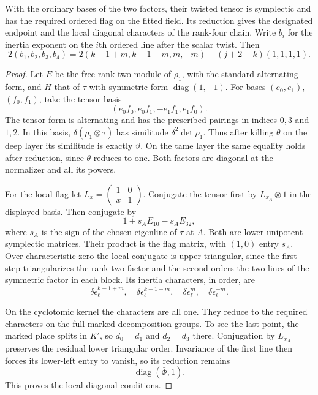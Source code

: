 \begin{proposition}\label{prop:count-three-tensor-endpoint}
With the ordinary bases of the two factors, their twisted tensor
is symplectic and has the required ordered flag on the fitted
field. Its reduction gives the designated endpoint and the local diagonal characters of the rank-four chain. Write \(b_i\) for the inertia exponent on the \(i\)th ordered line after the scalar twist. Then 
\[
 2(b_1,b_2,b_3,b_4)=2(k-1+m,k-1-m,m,-m)+(j+2-k)(1,1,1,1).
\]

\end{proposition}

\begin{proof}
Let \(E\) be the free rank-two module of \(\rho_1\), with
the standard alternating form, and \(H\) that of \(\tau\)
with symmetric form \(\operatorname{diag}(1,-1)\).
For bases \((e_0,e_1)\), \((f_0,f_1)\), take the tensor
basis
\[
               (e_0 f_0,e_0 f_1,-e_1 f_1,e_1 f_0).
\]
The tensor form is alternating and has the prescribed
pairings in indices \(0,3\) and \(1,2\). In this basis,
\(\delta(\rho_1\otimes\tau)\) has similitude
\(\delta^2\det\rho_1\). Thus after killing \(\theta\)
on the deep layer its similitude is exactly
\(\vartheta\). On the tame layer the same equality
holds after reduction, since \(\theta\) reduces to one.
Both factors are diagonal at the normalizer and all
its powers.


For the local flag let \(L_x=\begin{pmatrix}1&0\\x&1\end{pmatrix}\).
Conjugate the tensor first by \(L_{x_A}\otimes1\) in
the displayed basis. Then conjugate by
\[
             1+s_A E_{10}-s_A E_{32},
\]
where \(s_A\) is the sign of the chosen eigenline of
\(\tau\) at \(A\). Both are lower unipotent symplectic
matrices. Their product is the flag matrix, with
\((1,0)\) entry \(s_A\).
Over characteristic zero the local conjugate is upper
triangular, since the first step triangularizes the
rank-two factor and the second orders the two lines
of the symmetric factor in each block. Its inertia
characters, in order, are
\[
       \delta\epsilon_\ell^{k-1+m},\quad
       \delta\epsilon_\ell^{k-1-m},\quad
       \delta\epsilon_\ell^m,\quad
       \delta\epsilon_\ell^{-m}.
\]

On the cyclotomic kernel the characters are all one.
They reduce to the required characters on the full
marked decomposition groups. To see the last point,
the marked place splits in \(K'\), so \(d_0=d_1\)
and \(d_2=d_3\) there. Conjugation by \(L_{x_A}\) preserves the residual lower
triangular order. Invariance of the first line then forces its
lower-left entry to vanish, so its reduction remains
\[
                          \operatorname{diag}(\bar\Phi,1).
\]
This proves the local diagonal conditions.


\end{proof}
